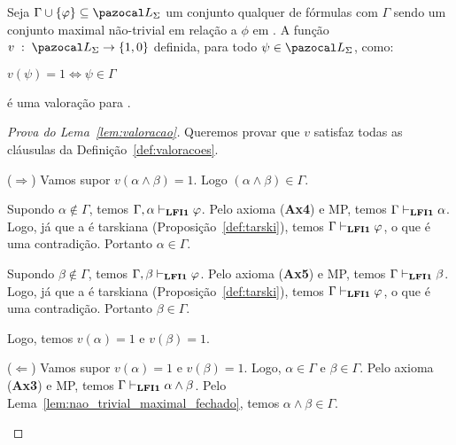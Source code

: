     \begin{lema}\label{lem:valoracao}
        Seja $\Gamma \cup \{\phi\} \subseteq \ling{}$ um conjunto qualquer de fórmulas com $\Gamma$ sendo um conjunto maximal não-trivial em relação a $\phi$ em \lfium{}. A função $v \; : \; \ling \to \{1, 0\}$ definida, para todo $\psi \in \ling$, como:
        \begin{center}
                $v(\psi) = 1 \Longleftrightarrow \psi \in \Gamma$
        \end{center}

        é uma valoração para \lfium{}.
    \end{lema}

    \begin{proof}[Prova do Lema~\ref{lem:valoracao}]
        Queremos provar que $v$ satisfaz todas as cláusulas da Definição~\ref{def:valoracoes}.

        \begin{provaporcasos}
            

                \begin{adjustwidth}{1cm}{}
                    \noindent ($\Longrightarrow$) Vamos supor $v(\alpha \land \beta) = 1$. Logo $(\alpha \land \beta) \in \Gamma$. 
                    
                    \noindent Supondo $\alpha \not \in \Gamma$, temos $\Gamma, \alpha \vdash_{{\normalfont\textbf{LFI1}}{}} \varphi$. Pelo axioma (\textbf{Ax4}) e MP, temos $\Gamma \vdash_{{\normalfont\textbf{LFI1}}{}} \alpha$. Logo, já que a \lfium{} é tarskiana (Proposição~\ref{def:tarski}), temos $\Gamma \vdash_{{\normalfont\textbf{LFI1}}{}} \varphi$, o que é uma contradição. Portanto $\alpha \in \Gamma$.
        
                    \noindent Supondo $\beta \not \in \Gamma$, temos $\Gamma, \beta \vdash_{{\normalfont\textbf{LFI1}}{}} \varphi$. Pelo axioma (\textbf{Ax5}) e MP, temos $\Gamma \vdash_{{\normalfont\textbf{LFI1}}{}} \beta$. Logo, já que a \lfium{} é tarskiana (Proposição~\ref{def:tarski}), temos $\Gamma \vdash_{{\normalfont\textbf{LFI1}}{}} \varphi$, o que é uma contradição. Portanto $\beta \in \Gamma$.
        
                    \noindent Logo, temos $v(\alpha) = 1$ e $v(\beta) = 1$.

                \end{adjustwidth}

                \begin{adjustwidth}{1cm}{}
                    \noindent ($\Longleftarrow$) Vamos supor $v(\alpha) = 1$ e $v(\beta) = 1$. Logo, $\alpha \in \Gamma$ e $\beta \in \Gamma$. Pelo axioma (\textbf{Ax3}) e MP, temos $\Gamma \vdash_{{\normalfont\textbf{LFI1}}{}} \alpha \land \beta$. Pelo Lema~\ref{lem:nao_trivial_maximal_fechado}, temos $\alpha \land \beta \in \Gamma$.


\end{adjustwidth}
\end{provaporcasos}
\end{proof}
